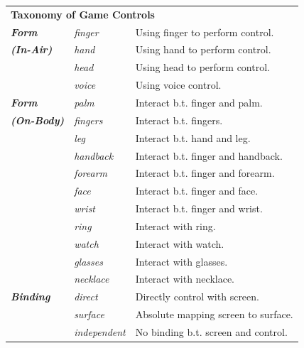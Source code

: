 \documentclass{sigchi}
\newcommand\tabhead[1]{\small\textbf{#1}}
\begin{document}
    \begin{table}
    \centering
    \begin{adjustwidth}{-0.4cm}{}
    \begin{tabular}{|l|l|l|}
      \hline
      \multicolumn{3}{|p{\columnwidth}|}{\centering\tabhead{\textbf{Taxonomy of Game Controls}}}\\
      \Xhline{4\arrayrulewidth}
        \textbf{\em{Form}} & \em{finger} & Using finger to perform control.\\ \cline{2-3} 
        \textbf{\em{{\fontsize{0.3cm}{1em}\selectfont (In-Air)}}}  & \em{hand} & Using hand to perform control.\\ \cline{2-3} 
             & \em{head} & Using head to perform control.\\ \cline{2-3} 
             & \em{voice} & Using voice control.\\ 
      \Xhline{4\arrayrulewidth}
        \textbf{\em{Form}} & \em{palm} & Interact b.t. finger and palm. \\ \cline{2-3} 
        \textbf{\em{{\fontsize{0.3cm}{1em}\selectfont (On-Body)}}} & \em{fingers} & Interact b.t. fingers.\\ \cline{2-3} 
             & \em{leg} & Interact b.t. hand and leg.\\ \cline{2-3} 
             & \em{handback} & Interact b.t. finger and handback.\\ \cline{2-3} 
             & \em{forearm} & Interact b.t. finger and forearm.\\ \cline{2-3} 
             & \em{face} & Interact b.t. finger and face.\\ \cline{2-3} 
             & \em{wrist} & Interact b.t. finger and wrist.\\ \cline{2-3} 
             & \em{ring} & Interact with ring. \\ \cline{2-3} 
             & \em{watch} & Interact with watch.\\ \cline{2-3} 
             & \em{glasses} & Interact with glasses.\\ \cline{2-3} 
             & \em{necklace} & Interact with necklace.\\ 
      \Xhline{4\arrayrulewidth}
        \textbf{\em{Binding}} & \em{direct} & Directly control with screen. \\ \cline{2-3} 
             & \em{surface} & Absolute mapping screen to surface.\\ \cline{2-3} 
             & \em{independent} & No binding b.t. screen and control.\\

\end{tabular}
\end{adjustwidth}
\end{table}
\end{document}
